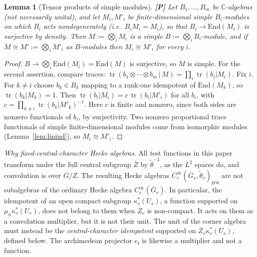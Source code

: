 \documentclass[12pt]{article}
\newcommand{\ov}[1]{\overline{#1}}
\newcommand{\C}{\mathbb{C}}
\newcommand{\gen}{\mathrm{gen}}
\newcommand{\tr}{\operatorname{tr}}
\newcommand{\Gb}{\ov{G}}
\newcommand{\Zb}{\ov{Z}}
\newcommand{\ks}{\kappa^{*}}
\newcommand{\Pv}{\textbf{[P]}}
\theoremstyle{plain}
\newtheorem{lemma}[theorem]{Lemma}
\theoremstyle{definition}
\begin{document}
\begin{lemma}[Tensor products of simple modules]\label{lem:tensor}\Pv
Let $B_1,\dots,B_m$ be $\C$-algebras (not necessarily unital), and let $M_i,M'_i$ be finite-dimensional simple $B_i$-modules on which $B_i$ acts nondegenerately (i.e.\ $B_iM_i=M_i$), so that $B_i\to\mathrm{End}(M_i)$ is surjective by density. Then $M:=\bigotimes_iM_i$ is a simple $B:=\bigotimes_iB_i$-module, and if $M\cong M':=\bigotimes_iM'_i$ as $B$-modules then $M_i\cong M'_i$ for every $i$.
\end{lemma}
\begin{proof}
$B\to\bigotimes_i\mathrm{End}(M_i)=\mathrm{End}(M)$ is surjective, so $M$ is simple. For the second assertion, compare traces: $\tr(b_1\otimes\cdots\otimes b_m\,|\,M)=\prod_i\tr(b_i|M_i)$. Fix $i$. For $k\neq i$ choose $b_k\in B_k$ mapping to a rank-one idempotent of $\mathrm{End}(M_k)$, so $\tr(b_k|M_k)=1$. Then $\tr(b_i|M_i)=c\,\tr(b_i|M'_i)$ for all $b_i$, with $c=\prod_{k\ne i}\tr(b_k|M'_k)^{-1}$. Here $c$ is finite and nonzero, since both sides are nonzero functionals of $b_i$, by surjectivity. Two nonzero proportional trace functionals of simple finite-dimensional modules come from isomorphic modules (Lemma~\ref{lem:linind}), so $M_i\cong M'_i$.
\end{proof}

\emph{Why fixed-central-character Hecke algebras.} All test functions in this paper transform under the full central subgroup $\Zb$ by $\tilde\theta^{-1}$, as the $L^2$ spaces do, and convolution is over $G/Z$. The resulting Hecke algebras $C_c^\infty(\Gb_v,\tilde\theta_v)_\gen$ are not subalgebras of the ordinary Hecke algebra $C_c^\infty(\Gb_v)$. In particular, the idempotent of an open compact subgroup $\ks_v(U_v)$, a function supported on $\mu_n\ks_v(U_v)$, does not belong to them when $\Zb_v$ is non-compact. It acts on them as a convolution multiplier, but it is not their unit. The unit of the corner algebra must instead be the \emph{central-character idempotent} supported on $\Zb_v\ks_v(U_v)$, defined below. The archimedean projector $e_{\mathfrak t}$ is likewise a multiplier and not a function.
\end{document}
